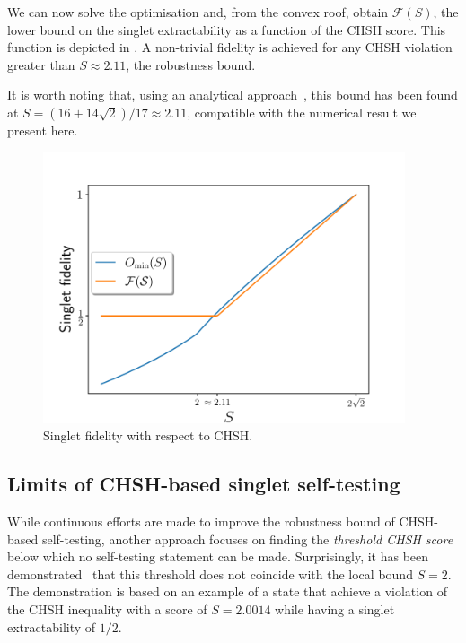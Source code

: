 We can now solve the optimisation  and, from the convex roof, obtain $\mathcal{F}(S)$, the lower bound on the singlet extractability as a function of the CHSH score.
This function is depicted in .
A non-trivial fidelity is achieved for any CHSH violation greater than $S \approx 2.11$, the robustness bound. 

It is worth noting that, using an analytical approach~\cite{Kaniewski2016}, this bound has been found at $S=(16+14\sqrt{2})/17\approx2.11$, compatible with the numerical result we present here.

\begin{figure}
	\begin{center}
		\includegraphics[width=0.95\textwidth]{chapters/selftesting/img/fidCHSH.pdf}
	\end{center}
	\caption{Singlet fidelity with respect to CHSH.}
	\label{fig:fidCHSH}
\end{figure}

\subsection{Limits of CHSH-based singlet self-testing}

While continuous efforts are made to improve the robustness bound of CHSH-based self-testing, another approach focuses on finding the \textit{threshold CHSH score} below which no self-testing statement can be made.
Surprisingly, it has been demonstrated~\cite{Coopmans19} that this threshold does not coincide with the local bound $S=2$.
The demonstration is based on an example of a state that achieve a violation of the CHSH inequality with a score of $S=2.0014$ while having a singlet extractability of $1/2$.

